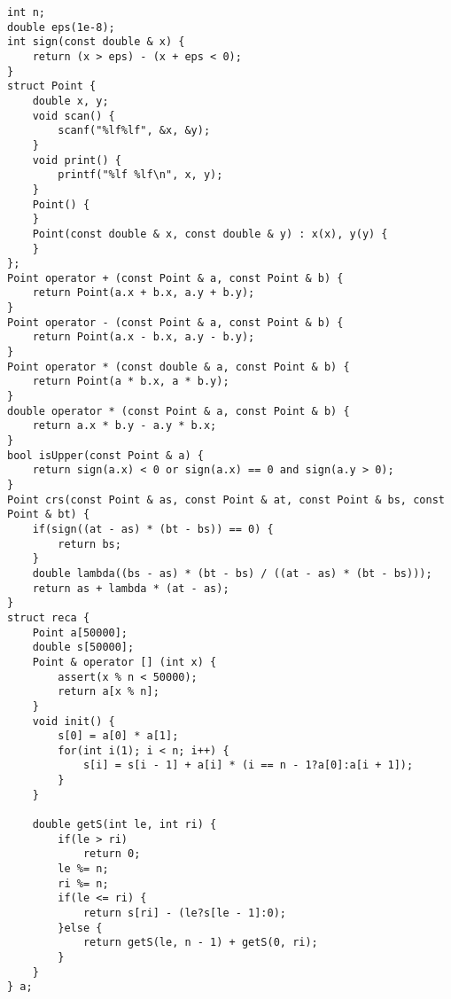 \begin{lstlisting}
int n;
double eps(1e-8);
int sign(const double & x) {
	return (x > eps) - (x + eps < 0);
}
struct Point {
	double x, y;
	void scan() {
		scanf("%lf%lf", &x, &y);
	}
	void print() {
		printf("%lf %lf\n", x, y);
	}
	Point() {
	}
	Point(const double & x, const double & y) : x(x), y(y) {
	}
};
Point operator + (const Point & a, const Point & b) {
	return Point(a.x + b.x, a.y + b.y);
}
Point operator - (const Point & a, const Point & b) {
	return Point(a.x - b.x, a.y - b.y);
}
Point operator * (const double & a, const Point & b) {
	return Point(a * b.x, a * b.y);
}
double operator * (const Point & a, const Point & b) {
	return a.x * b.y - a.y * b.x;
}
bool isUpper(const Point & a) {
	return sign(a.x) < 0 or sign(a.x) == 0 and sign(a.y > 0);
}
Point crs(const Point & as, const Point & at, const Point & bs, const Point & bt) {
	if(sign((at - as) * (bt - bs)) == 0) {
		return bs;
	}
	double lambda((bs - as) * (bt - bs) / ((at - as) * (bt - bs)));
	return as + lambda * (at - as);
}
struct reca {
	Point a[50000];
	double s[50000];
	Point & operator [] (int x) {
		assert(x % n < 50000);
		return a[x % n];
	}
	void init() {
		s[0] = a[0] * a[1];
		for(int i(1); i < n; i++) {
			s[i] = s[i - 1] + a[i] * (i == n - 1?a[0]:a[i + 1]);
		}
	}

	double getS(int le, int ri) {
		if(le > ri)
			return 0;
		le %= n;
		ri %= n;
		if(le <= ri) {
			return s[ri] - (le?s[le - 1]:0);
		}else {
			return getS(le, n - 1) + getS(0, ri);
		}
	}
} a;


\end{lstlisting}
